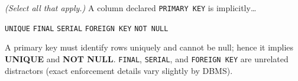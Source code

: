 \question[4] 
\textit{(Select all that apply.)} A column declared \lstinline[style=sqlinline]!PRIMARY KEY! is implicitly\ldots
\begin{checkboxes}
  \CorrectChoice \lstinline[style=sqlinline]!UNIQUE!
  \choice \lstinline[style=sqlinline]!FINAL!
  \choice \lstinline[style=sqlinline]!SERIAL! 
  \choice \lstinline[style=sqlinline]!FOREIGN KEY!
  \CorrectChoice \lstinline[style=sqlinline]!NOT NULL!
\end{checkboxes}
\begin{solution}
  A primary key must identify rows uniquely and cannot be null; hence it implies \textbf{UNIQUE} and \textbf{NOT NULL}. \texttt{FINAL}, \texttt{SERIAL}, and \texttt{FOREIGN KEY} are unrelated distractors (exact enforcement details vary slightly by DBMS).
\end{solution}


\newpage


